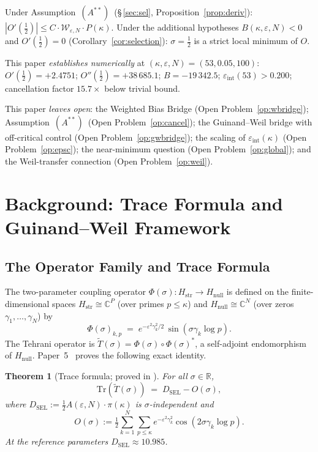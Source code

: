 \documentclass[11pt]{article}
\newtheorem{theorem}{Theorem}[section]
\newcommand{\Hstr}{H_{\mathrm{str}}}
\newcommand{\Hnull}{H_{\mathrm{null}}}
\newcommand{\Tt}{\widetilde{T}}
\newcommand{\DSEL}{D_{\mathrm{SEL}}}
\newcommand{\Wgamma}{\mathcal{W}_{\varepsilon,N}}   %
\newcommand{\Astar}{\ensuremath{(A^{**})}}  %
\begin{document}
Under Assumption~\Astar\
(\S\,\ref{sec:sel}, Proposition~\ref{prop:deriv}):
$|O'(\tfrac12)|\le C\cdot\Wgamma\cdot P(\kappa)$.
Under the additional hypotheses $B(\kappa,\varepsilon,N)<0$ and
$O'(\tfrac12)=0$ (Corollary~\ref{cor:selection}):
$\sigma=\tfrac12$ is a strict local minimum of $O$.

This paper \emph{establishes numerically} at
$(\kappa,\varepsilon,N)=(53,0.05,100)$:
$O'(\tfrac12)=+2.4751$; $O''(\tfrac12)=+38\,685.1$; $B=-19\,342.5$;
$\varepsilon_{\mathrm{int}}(53)>0.200$; cancellation factor $15.7\times$ below trivial bound.

This paper \emph{leaves open}:
the Weighted Bias Bridge (Open Problem~\ref{op:wbridge});
Assumption~\Astar\ (Open Problem~\ref{op:cancel});
the Guinand--Weil bridge with off-critical control (Open Problem~\ref{op:gwbridge});
the scaling of $\varepsilon_{\mathrm{int}}(\kappa)$ (Open Problem~\ref{op:epsc});
the near-minimum question (Open Problem~\ref{op:global});
and the Weil-transfer connection (Open Problem~\ref{op:weil}).

\section{Background: Trace Formula and Guinand--Weil Framework}
\label{sec:bg}

\subsection{The Operator Family and Trace Formula}

The two-parameter coupling operator $\Phi(\sigma):\Hstr\to\Hnull$
is defined on the finite-dimensional spaces $\Hstr\cong\mathbb{C}^P$
(over primes $p\le\kappa$) and $\Hnull\cong\mathbb{C}^N$
(over zeros $\gamma_1,\ldots,\gamma_N$) by
\[
\Phi(\sigma)_{k,p} \;=\; e^{-\varepsilon^2\gamma_k^2/2}\,\sin(\sigma\gamma_k\log p).
\]
The Tehrani operator is $\Tt(\sigma)=\Phi(\sigma)\circ\Phi(\sigma)^*$,
a self-adjoint endomorphism of $\Hnull$.
Paper~5~\cite{Paper5} proves the following exact identity.

\begin{theorem}[Trace formula; proved in \cite{Paper5}]
\label{thm:trace}
For all $\sigma\in\mathbb{R}$,
\[
\mathrm{Tr}(\Tt(\sigma)) \;=\; \DSEL - O(\sigma),
\]
where $\DSEL:=\tfrac12 A(\varepsilon,N)\cdot\pi(\kappa)$ is
$\sigma$-independent and
\[
O(\sigma):=\tfrac12\sum_{k=1}^N\sum_{p\le\kappa}
e^{-\varepsilon^2\gamma_k^2}\cos(2\sigma\gamma_k\log p).
\]
At the reference parameters $\DSEL\approx 10.985$.
\end{theorem}
\end{document}
